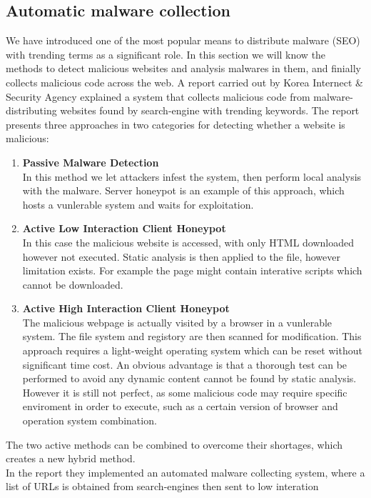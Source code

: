 \subsection*{Automatic malware collection}
We have introduced one of the most popular means to distribute malware (SEO) 
with trending terms as a significant role. In this section we will know the 
methods to detect malicious websites and analysis malwares in them, and 
finially collects malicious code across the web. A report carried out by Korea 
Internect \& Security Agency\cite{automalwarecollecting} explained a system 
that collects malicious code from malware-distributing websites found by 
search-engine with trending keywords. The report presents three approaches in 
two categories for detecting whether a website is malicious: 
\begin{enumerate}
\item 
{\bf Passive Malware Detection}\\
In this method we let attackers infest the system, then perform local analysis 
with the malware. Server honeypot is an example of this approach, which hosts 
a vunlerable system and waits for exploitation.   
\item
{\bf Active Low Interaction Client Honeypot}\\
In this case the malicious website is accessed, with only HTML downloaded 
however not executed. Static analysis is then applied to the file, however 
limitation exists. For example the page might contain interative scripts 
which cannot be downloaded. 
\item
{\bf Active High Interaction Client Honeypot}\\
The malicious webpage is actually visited by a browser in a vunlerable system. 
The file system and registory are then scanned for modification. This approach 
requires a light-weight operating system which can be reset without 
significant time cost. An obvious advantage is that a thorough test can be 
performed to avoid any dynamic content cannot be found by static analysis. 
However it is still not perfect, as some malicious code may require specific 
enviroment in order to execute, such as a certain version of browser and 
operation system combination. 
\end{enumerate} 
The two active methods can be combined to overcome their shortages, which 
creates a new hybrid method. \\
In the report they implemented an automated malware collecting system, where a 
list of URLs is obtained from search-engines then sent to low interation 
